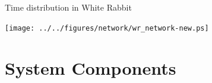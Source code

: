 \documentclass[compress,red]{beamer}
\begin{document}
\subsection{}
\begin{frame}{Time distribution in White Rabbit}



    \begin{center}
    \texttt{[image: ../../figures/network/wr\_network-new.ps]}
    \end{center}

\end{frame}

\section{System Components}
\end{document}
